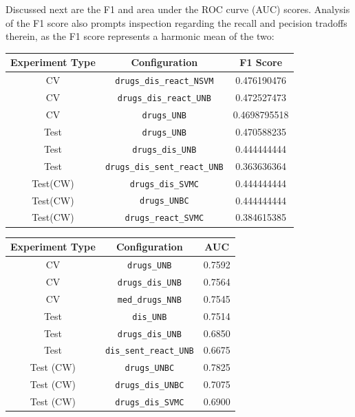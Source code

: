 \documentclass[twoside,11pt]{article}
\begin{document}
Discussed next are the F1 and area under the ROC curve (AUC) scores. Analysis of the F1 score also prompts inspection regarding the recall and pecision tradoffs therein, as the F1 score represents a harmonic mean of the two:
\begin{center}
  \begin{tabular}{||c c c||}
    \hline
    Experiment Type & Configuration & F1 Score\\
    \hline\hline
    CV & \verb|drugs_dis_react_NSVM| & 0.476190476 \\
    \hline
    CV & \verb|drugs_dis_react_UNB| & 0.472527473 \\
    \hline
    CV & \verb|drugs_UNB| & 0.4698795518 \\
    \hline
    Test & \verb|drugs_UNB| & 0.470588235 \\
    \hline
    Test & \verb|drugs_dis_UNB| & 0.444444444 \\
    \hline
    Test & \verb|drugs_dis_sent_react_UNB| & 0.363636364 \\
    \hline
    Test(CW) & \verb|drugs_dis_SVMC| & 0.444444444 \\
    \hline
    Test(CW) & \verb|drugs_UNBC| & 0.444444444 \\
    \hline
    Test(CW) & \verb|drugs_react_SVMC| & 0.384615385 \\
    \hline
  \end{tabular}
\end{center}
\begin{center}
  \begin{tabular}{||c c c||}
    \hline Experiment Type & Configuration & AUC \\
    \hline\hline
    CV & \verb|drugs_UNB| & 0.7592 \\
    \hline
    CV & \verb|drugs_dis_UNB| & 0.7564 \\
    \hline
    CV & \verb|med_drugs_NNB| & 0.7545 \\
    \hline
    Test & \verb|dis_UNB| & 0.7514 \\
    \hline
    Test & \verb|drugs_dis_UNB| & 0.6850 \\
    \hline
    Test & \verb|dis_sent_react_UNB| & 0.6675 \\
    \hline
    Test (CW) & \verb|drugs_UNBC| & 0.7825 \\
    \hline
    Test (CW) & \verb|drugs_dis_UNBC| & 0.7075 \\
    \hline
    Test (CW) & \verb|drugs_dis_SVMC| & 0.6900 \\
    \hline
  \end{tabular}
\end{center}
\end{document}
